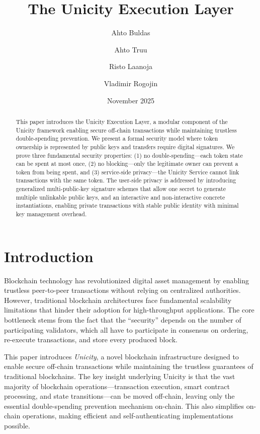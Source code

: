 \documentclass{article}
\title{ The Unicity Execution Layer }
\author{Ahto Buldas \and Ahto Truu \and Risto Laanoja \and Vladimir Rogojin}
\date{November 2025}
\begin{document}
\maketitle

\begin{abstract}
This paper introduces the Unicity Execution Layer, a modular component of the Unicity framework enabling secure off-chain transactions while maintaining trustless double-spending prevention. We present a formal security model where token ownership is represented by public keys and transfers require digital signatures. We prove three fundamental security properties: (1) no double-spending---each token state can be spent at most once, (2) no blocking---only the legitimate owner can prevent a token from being spent, and (3) service-side privacy---the Unicity Service cannot link transactions with the same token. The user-side privacy is addressed by introducing generalized multi-public-key signature schemes that allow one secret to generate multiple unlinkable public keys, and an interactive and non-interactive concrete instantiations, enabling private transactions with stable public identity with minimal key management overhead.
\end{abstract}

\section{Introduction}

Blockchain technology has revolutionized digital asset management by enabling trustless peer-to-peer transactions without relying on centralized authorities. However, traditional blockchain architectures face fundamental scalability limitations that hinder their adoption for high-throughput applications. The core bottleneck stems from the fact that the ``security'' depends on the number of participating validators, which all have to participate in consensus on ordering, re-execute transactions, and store every produced block.

This paper introduces \emph{Unicity}, a novel blockchain infrastructure designed to enable secure off-chain transactions while maintaining the trustless guarantees of traditional blockchains. The key insight underlying Unicity is that the vast majority of blockchain operations—transaction execution, smart contract processing, and state transitions—can be moved off-chain, leaving only the essential double-spending prevention mechanism on-chain. This also simplifies on-chain operations, making efficient and self-authenticating implementations possible.
\end{document}
